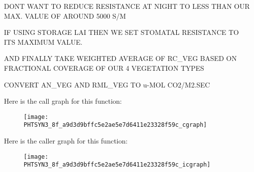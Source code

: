 D\+O\+N\textquotesingle{}T W\+A\+N\+T T\+O R\+E\+D\+U\+C\+E R\+E\+S\+I\+S\+T\+A\+N\+C\+E A\+T N\+I\+G\+H\+T T\+O L\+E\+S\+S T\+H\+A\+N O\+U\+R M\+A\+X. V\+A\+L\+U\+E O\+F A\+R\+O\+U\+N\+D 5000 S/\+M

I\+F U\+S\+I\+N\+G S\+T\+O\+R\+A\+G\+E L\+A\+I T\+H\+E\+N W\+E S\+E\+T S\+T\+O\+M\+A\+T\+A\+L R\+E\+S\+I\+S\+T\+A\+N\+C\+E T\+O I\+T\+S M\+A\+X\+I\+M\+U\+M V\+A\+L\+U\+E.

A\+N\+D F\+I\+N\+A\+L\+L\+Y T\+A\+K\+E W\+E\+I\+G\+H\+T\+E\+D A\+V\+E\+R\+A\+G\+E O\+F R\+C\+\_\+\+V\+E\+G B\+A\+S\+E\+D O\+N F\+R\+A\+C\+T\+I\+O\+N\+A\+L C\+O\+V\+E\+R\+A\+G\+E O\+F O\+U\+R 4 V\+E\+G\+E\+T\+A\+T\+I\+O\+N T\+Y\+P\+E\+S

C\+O\+N\+V\+E\+R\+T A\+N\+\_\+\+V\+E\+G A\+N\+D R\+M\+L\+\_\+\+V\+E\+G T\+O u-\/\+M\+O\+L C\+O2/\+M2.\+S\+E\+C

Here is the call graph for this function\+:\nopagebreak
\begin{figure}[H]
\begin{center}
\leavevmode
\texttt{[image: PHTSYN3\_8f\_a9d3d9bffc5e2ae5e7d6411e23328f59c\_cgraph]}
\end{center}
\end{figure}




Here is the caller graph for this function\+:\nopagebreak
\begin{figure}[H]
\begin{center}
\leavevmode
\texttt{[image: PHTSYN3\_8f\_a9d3d9bffc5e2ae5e7d6411e23328f59c\_icgraph]}
\end{center}
\end{figure}



